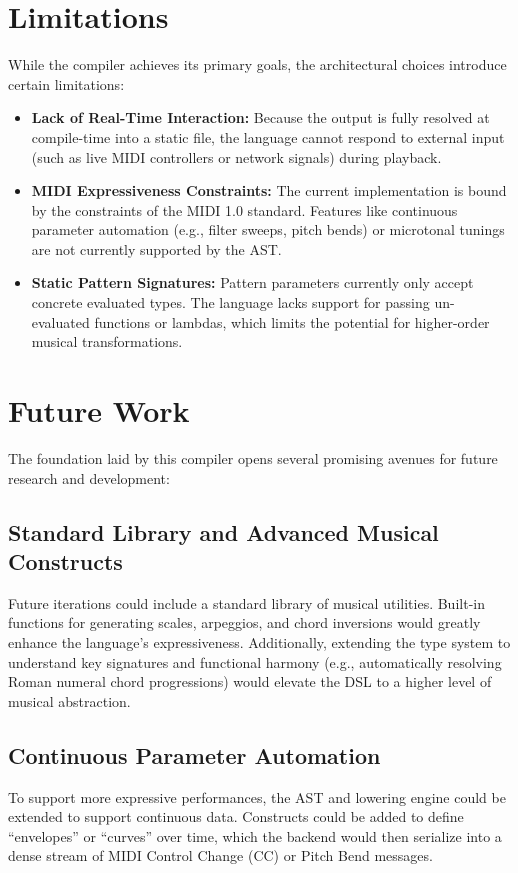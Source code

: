 \section{Limitations}\label{sec:limitations}

While the compiler achieves its primary goals, the architectural choices introduce certain limitations:
\begin{itemize}
  \item \textbf{Lack of Real-Time Interaction:} Because the output is fully resolved at compile-time into a static file,
    the language cannot respond to external input (such as live MIDI controllers or network signals) during playback.
  \item \textbf{MIDI Expressiveness Constraints:} The current implementation is bound by the constraints of the MIDI 1.0
    standard.
    Features like continuous parameter automation (e.g., filter sweeps, pitch bends) or microtonal tunings are not
    currently supported by the AST\@.
  \item \textbf{Static Pattern Signatures:} Pattern parameters currently only accept concrete evaluated types.
    The language lacks support for passing un-evaluated functions or lambdas, which limits the potential for
    higher-order musical transformations.
\end{itemize}

\section{Future Work}\label{sec:future-work}

The foundation laid by this compiler opens several promising avenues for future research and development:

\subsection{Standard Library and Advanced Musical
Constructs}\label{subsec:standard-library-and-advanced-musical-constructs}
Future iterations could include a standard library of musical utilities.
Built-in functions for generating scales, arpeggios, and chord inversions would greatly enhance the language's
expressiveness.
Additionally, extending the type system to understand key signatures and functional harmony (e.g., automatically
resolving Roman numeral chord progressions) would elevate the DSL to a higher level of musical abstraction.

\subsection{Continuous Parameter Automation}\label{subsec:continuous-parameter-automation}
To support more expressive performances, the AST and lowering engine could be extended to support continuous data.
Constructs could be added to define ``envelopes'' or ``curves'' over time, which the backend would then serialize into a
dense stream of MIDI Control Change (CC) or Pitch Bend messages.

